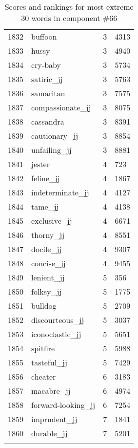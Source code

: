 \begin{longtable}[!htbp]{| rlr@{.}l |}
    1832 & buffoon & 3 & 4313 \\
    1833 & hussy & 3 & 4940 \\
    1834 & cry-baby & 3 & 5734 \\
    1835 & satiric\_jj & 3 & 5763 \\
    1836 & samaritan & 3 & 7575 \\
    1837 & compassionate\_jj & 3 & 8075 \\
    1838 & cassandra & 3 & 8391 \\
    1839 & cautionary\_jj & 3 & 8854 \\
    1840 & unfailing\_jj & 3 & 8881 \\
    1841 & jester & 4 & 723 \\
    1842 & feline\_jj & 4 & 1867 \\
    1843 & indeterminate\_jj & 4 & 4127 \\
    1844 & tame\_jj & 4 & 4138 \\
    1845 & exclusive\_jj & 4 & 6671 \\
    1846 & thorny\_jj & 4 & 8551 \\
    1847 & docile\_jj & 4 & 9307 \\
    1848 & concise\_jj & 4 & 9455 \\
    1849 & lenient\_jj & 5 & 356 \\
    1850 & folksy\_jj & 5 & 1775 \\
    1851 & bulldog & 5 & 2709 \\
    1852 & discourteous\_jj & 5 & 3037 \\
    1853 & iconoclastic\_jj & 5 & 5651 \\
    1854 & spitfire & 5 & 5988 \\
    1855 & tasteful\_jj & 5 & 7429 \\
    1856 & cheater & 6 & 3183 \\
    1857 & macabre\_jj & 6 & 4974 \\
    1858 & forward-looking\_jj & 6 & 7254 \\
    1859 & imprudent\_jj & 7 & 1841 \\
    1860 & durable\_jj & 7 & 5201 \\
    \hline
    \caption{Scores and rankings for most extreme 30 words in component \#66} \\
\end{longtable}
